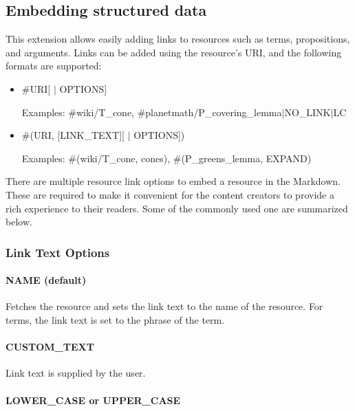 \documentclass[a4paper]{article}
\begin{document}
\subsection{Embedding structured data}

This extension allows easily adding links to resources such as terms, propositions, and arguments. Links can be added using the resource's URI, and the following formats are supported:


\begin{itemize}

	\item \#URI[ $\vert$ OPTIONS]

	Examples: \#wiki/T\_cone, \#planetmath/P\_covering\_lemma$\vert$NO\_LINK$\vert$LC

	\item \#(URI, [\textquotesingle LINK\_TEXT\textquotesingle][ $\vert$ OPTIONS])

	Examples: \#(wiki/T\_cone, \textquotesingle cones\textquotesingle), \#(P\_greens\_lemma, EXPAND)

\end{itemize}

There are multiple resource link options to embed a resource in the Markdown. These are required to make it convenient for the content creators to provide a rich experience to their readers. Some of the commonly used one are summarized below.

\subsubsection{Link Text Options}

\paragraph{NAME (default)}

Fetches the resource and sets the link text to the name of the resource. For terms, the link text is set to the phrase of the term.

\paragraph{CUSTOM\_TEXT}
Link text is supplied by the user.

\paragraph{LOWER\_CASE or UPPER\_CASE}
\end{document}
